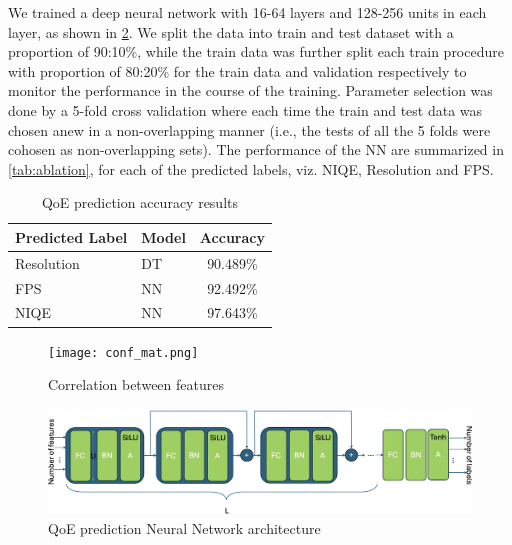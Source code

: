 We trained a deep neural network with 16-64 layers and 128-256 units in each layer, as shown in \cref{fig:nn-arch}. We split the data into train and test dataset with a proportion of 90:10\%, while the train data was further split each train procedure with proportion of 80:20\% for the train data and validation respectively to monitor the performance in the course of the training. 
Parameter selection was done by a 5-fold cross validation where each time the train and test data was chosen anew in a non-overlapping manner (i.e., the tests of all the 5 folds were cohosen as non-overlapping sets).
The performance of the NN are summarized in \cref{tab:ablation}, for each of the predicted labels, viz. NIQE, Resolution and FPS.

\begin{table}[]
    \centering
    \caption{QoE prediction accuracy results}
    \begin{tabular}{l|l|c}
        Predicted Label & Model & Accuracy \\
        \hline
        Resolution & DT & 90.489\% \\
        FPS & NN & 92.492\% \\
        NIQE & NN & 97.643\% \\

    \end{tabular}
    \label{tab:final_accuracy}
\end{table}

\begin{figure}
    \centering
    \texttt{[image: conf\_mat.png]}
    \caption{Correlation between features}
    \label{fig:feat-corr}
\end{figure}

\begin{figure}
    \centering
    \includegraphics[scale=0.45]{figures/QNN Design.png}
    \caption{QoE prediction Neural Network architecture}
    \label{fig:nn-arch}
\end{figure}